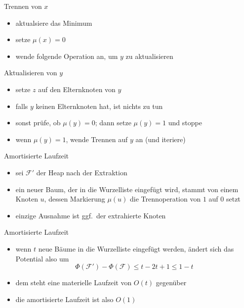 \documentclass[aspectratio=1610, 11pt]{beamer}
\newcommand\cF{\mathcal F}
\begin{document}
\begin{frame}
\begin{overprint}
\begin{exampleblock}{Trennen von $x$}
\begin{itemize}
				\item aktualsiere das Minimum
				\item setze $\mu(x)=0$
				\item wende folgende Operation an, um $y$ zu aktualisieren 
			\end{itemize}
		\end{exampleblock}	
		\begin{exampleblock}{Aktualisieren von $y$}
			\begin{itemize}
				\item setze $z$ auf den Elternknoten von $y$
				\item falls $y$ keinen Elternknoten hat, ist nichts zu tun
				\item sonst pr\"ufe, ob $\mu(y)=0$; dann setze $\mu(y)=1$ und stoppe
				\item wenn $\mu(y)=1$, wende Trennen auf $y$ an (und iteriere)
			\end{itemize}
		\end{exampleblock}	
		\begin{exampleblock}{Amortisierte Laufzeit}
			\begin{itemize}
				\item sei $\cF'$ der Heap nach der Extraktion
				\item ein neuer Baum, der in die Wurzelliste eingef\"ugt wird, stammt von einem Knoten $u$, dessen Markierung $\mu(u)$ die Trennoperation von $1$ auf $0$ setzt
				\item einzige Ausnahme ist ggf.\ der extrahierte Knoten
			\end{itemize}
		\end{exampleblock}	
		\begin{exampleblock}{Amortisierte Laufzeit}
			\begin{itemize}
				\item wenn $t$ neue B\"aume in die Wurzelliste eingef\"ugt werden, \"andert sich das Potential also um
					$$\Phi(\cF')-\Phi(\cF)\leq t-2t+1\leq 1-t$$
				\item dem steht eine materielle Laufzeit von $O(t)$ gegen\"uber
				\item die amortisierte Laufzeit ist also $O(1)$
			\end{itemize}
		\end{exampleblock}	
	\end{overprint}
\end{frame}
\end{document}
